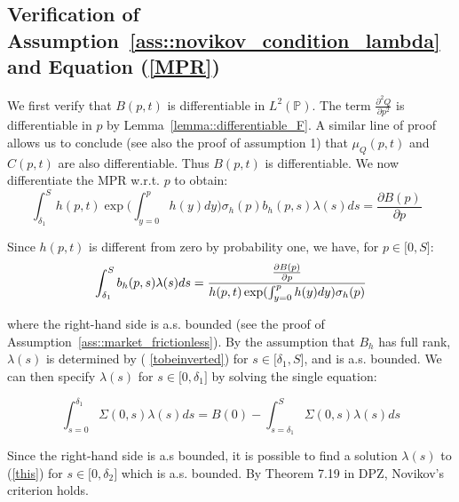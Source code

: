 \documentclass{article}
\begin{document}
\subsection{Verification of Assumption~\ref{ass::novikov_condition_lambda} and Equation (\protect\ref{MPR})}

We first verify that $B(p,t)$ is differentiable in $L^{2}(\mathbb{P})$. The
term $\frac{\partial ^{2}Q}{\partial p^{2}}$ is differentiable in $p$ by
Lemma~\ref{lemma::differentiable_F}. A similar line of proof allows us to conclude (see also the proof
of assumption 1) that $\mu _{Q}(p,t)$ and $C(p,t)$ are also differentiable.
Thus $B(p,t)$ is differentiable. We now differentiate the MPR w.r.t. $p$ to
obtain:%
\begin{equation*}
\int_{\delta _{1}}^{S}{h(p,t)}\exp ({\int_{y=0}^{p}h(y)dy)}\sigma
_{h}(p)b_{h}(p,s)\lambda (s)ds=\frac{\partial B(p)}{\partial p}\text{ }
\end{equation*}

Since ${h(p,t)}$ is different from zero by probability one, we have, for $%
p\in \lbrack 0,S]$:%
\begin{equation}
\int_{\delta _{1}}^{S}b_{h}(p,s)\lambda (s)ds=\frac{\frac{\partial B(p)}{%
\partial p}}{{h(p,t)}\exp ({\int_{y=0}^{p}h(y)dy)}\sigma _{h}(p)}
\label{tobeinverted}
\end{equation}

where the right-hand side is a.s. bounded (see the proof of Assumption~\ref{ass::market_frictionless}). By
the assumption that $B_{h}$ has full rank, $\lambda (s)$ is determined by (%
\ref{tobeinverted}) for $s\in \lbrack \delta _{1},S]$, and is a.s. bounded.
We can then specify $\lambda (s)$ for $s\in \lbrack 0,\delta _{1}]$ by
solving the single equation:

\begin{equation}
\int_{s=0}^{\delta _{1}}\Sigma (0,s)\lambda (s)ds=B(0)-\int_{s=\delta
_{1}}^{S}\Sigma (0,s)\lambda (s)ds  \label{this}
\end{equation}

Since the right-hand side is a.s bounded, it is possible to find a solution $%
\lambda (s)$ to (\ref{this}) for $s\in \lbrack 0,\delta _{2}]$ which is a.s.
bounded. By Theorem 7.19 in DPZ, Novikov's criterion holds.




\end{document}
